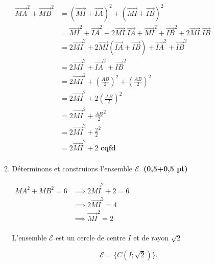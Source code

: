 \documentclass[12pt,a4paper]{article}
\begin{document}
\begin{enumerate}
\begin{enumerate}
        \( 
        \begin{aligned}
        \overrightarrow{MA}^2 + \overrightarrow{MB}^2 &= (\overrightarrow{MI}+\overrightarrow{IA})^2 + (\overrightarrow{MI}+\overrightarrow{IB})^2\\
        &= \overrightarrow{MI}^2+\overrightarrow{IA}^2+2\overrightarrow{MI}.\overrightarrow{IA}+ \overrightarrow{MI}^2+\overrightarrow{IB}^2+2\overrightarrow{MI}.\overrightarrow{IB}\\
        &= 2\overrightarrow{MI}^2+2\overrightarrow{MI}(\overrightarrow{IA}+\overrightarrow{IB})+\overrightarrow{IA}^2+\overrightarrow{IB}^2\\
        &= 2\overrightarrow{MI}^2+\overrightarrow{IA}^2+\overrightarrow{IB}^2\\
        &= 2\overrightarrow{MI}^2+\left( \frac{AB}{2}\right)^2+\left( \frac{AB}{2}\right)^{2}\\
        &= 2\overrightarrow{MI}^2+2\left( \frac{AB}{2}\right)^2\\
        &= 2\overrightarrow{MI}^2+\frac{AB}{2}^2\\
        &= 2\overrightarrow{MI}^2+\frac{2}{2}^2\\
        &= 2\overrightarrow{MI}^2+2 \textbf{ cqfd}\\
				\end{aligned}                
         \)
        \item Déterminons et construions l'ensemble \( \mathcal{E} \). \hfill \textbf{(0,5+0,5 pt)}
        
        \(
        \begin{aligned}
        MA^2 + MB^2 = 6 &\implies 2\overrightarrow{MI}^2+2 = 6\\
        								&\implies 2\overrightarrow{MI}^2   = 4\\
        								&\implies \overrightarrow{MI}^2   = 2\\
        \end{aligned}
         \)
         
         L'ensemble \( \mathcal{E} \) est un cercle de centre \(I\) et de rayon \( \sqrt{2} \)
         
          \[
					\mathcal{E}=\{ C(I;\sqrt{2}) \}.
					\]
    \end{enumerate}
    
\end{enumerate}
\end{document}
